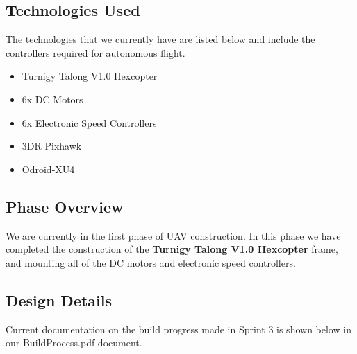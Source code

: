 \subsection{Technologies  Used}
The technologies that we currently have are listed below and include the controllers required for autonomous flight.
\begin{itemize}
	\item Turnigy Talong V1.0 Hexcopter
	\item 6x DC Motors
	\item 6x Electronic Speed Controllers
	\item 3DR Pixhawk
	\item Odroid-XU4
\end{itemize}
\subsection{Phase Overview}
We are currently in the first phase of UAV construction. In this phase we have completed the construction of the \textbf{Turnigy Talong V1.0 Hexcopter} frame, and mounting all of the DC motors and electronic speed controllers.
\subsection{Design Details}
Current documentation on the build progress made in Sprint 3 is shown below in our BuildProcess.pdf document.



 
